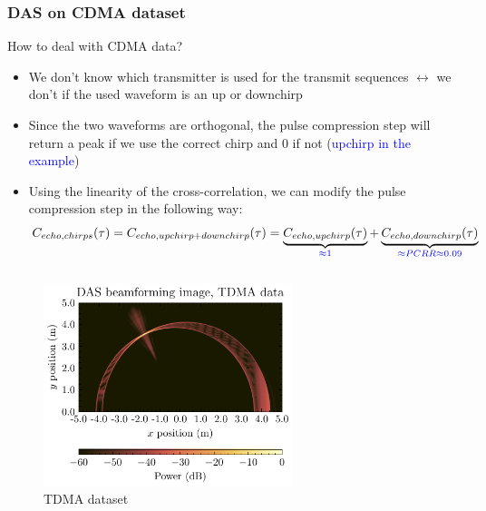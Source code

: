 \documentclass[UKenglish,8pt,aspectratio=1610]{beamer}
\begin{document}
\begin{frame}
	\frametitle{DAS on CDMA dataset}
How to deal with CDMA data?
\begin{itemize}
	\item We don't know which transmitter is used for the transmit sequences $\longleftrightarrow$ we don't if the used waveform is an up or downchirp
	\item Since the two waveforms are orthogonal, the pulse compression step will return a peak if we use the correct chirp and 0 if not (\textcolor{blue}{upchirp in the example})
	\item Using the linearity of the cross-correlation, we can modify the pulse compression step in the following way:
\begin{equation}
	C_{echo,chirps}(\tau) = C_{echo,upchirp + downchirp}(\tau) = \underbrace{C_{echo,upchirp}(\tau)}_{\textcolor{blue}{\approx 1}} + \underbrace{C_{echo,downchirp}(\tau)}_{\textcolor{blue}{\approx PCRR \approx 0.09}}
\end{equation}
\end{itemize}
\begin{columns}
	\begin{column}{0.5\textwidth}
		\begin{figure}[h!]
			\includegraphics[width=0.8\textwidth]{question3/TDMA_DAS_image.pdf}
			\centering
			\caption{TDMA dataset}
		\end{figure}
	\end{column}
	\begin{column}{0.5\textwidth}
		\begin{figure}[h!]

\end{figure}
\end{column}
\end{columns}
\end{frame}
\end{document}
